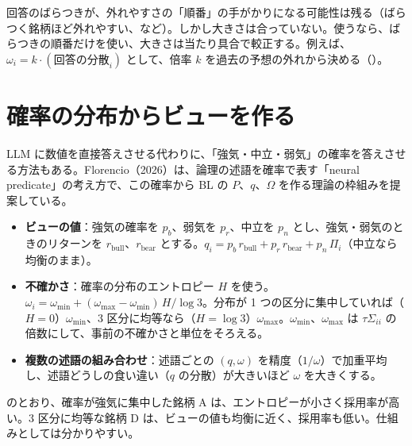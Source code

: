 \begin{notebox}[回答のばらつきの使い方]
回答のばらつきが、外れやすさの「順番」の手がかりになる可能性は残る（ばらつく銘柄ほど外れやすい、など）。しかし大きさは合っていない。使うなら、ばらつきの順番だけを使い、大きさは当たり具合で較正する。例えば、$\omega_i=k\cdot(\text{回答の分散}_i)$ として、倍率 $k$ を過去の予想の外れから決める（）。
\end{notebox}

\section{確率の分布からビューを作る}

LLM に数値を直接答えさせる代わりに、「強気・中立・弱気」の確率を答えさせる方法もある。Florencio（2026）は、論理の述語を確率で表す「neural predicate」の考え方で、この確率から BL の $P$、$q$、$\Omega$ を作る理論の枠組みを提案している。

\begin{itemize}
\item \textbf{ビューの値}：強気の確率を $p_b$、弱気を $p_r$、中立を $p_n$ とし、強気・弱気のときのリターンを $r_{\mathrm{bull}}$、$r_{\mathrm{bear}}$ とする。$q_i=p_b\,r_{\mathrm{bull}}+p_r\,r_{\mathrm{bear}}+p_n\,\Pi_i$（中立なら均衡のまま）。
\item \textbf{不確かさ}：確率の分布のエントロピー $H$ を使う。$\omega_i=\omega_{\min}+(\omega_{\max}-\omega_{\min})\,H/\log3$。分布が 1 つの区分に集中していれば（$H=0$）$\omega_{\min}$、3 区分に均等なら（$H=\log3$）$\omega_{\max}$。$\omega_{\min}$、$\omega_{\max}$ は $\tau\Sigma_{ii}$ の倍数にして、事前の不確かさと単位をそろえる。
\item \textbf{複数の述語の組み合わせ}：述語ごとの $(q,\omega)$ を精度（$1/\omega$）で加重平均し、述語どうしの食い違い（$q$ の分散）が大きいほど $\omega$ を大きくする。
\end{itemize}

\begin{table}[htbp]
\centering
\caption{確率の分布からビューを作る例（月次 \%）。$r_{\mathrm{bull}}=2\%$、$r_{\mathrm{bear}}=-2\%$、$\Pi_i=0.6\%$、$\sigma_i=8\%$、$\tau=0.05$、$\omega/\tau\sigma^2$ を 1〜20 の範囲でエントロピーに比例させた（倍率はこの資料が例として置いたもの）。}
\label{tab:stance}
\end{table}

 のとおり、確率が強気に集中した銘柄 A は、エントロピーが小さく採用率が高い。3 区分に均等な銘柄 D は、ビューの値も均衡に近く、採用率も低い。仕組みとしては分かりやすい。


